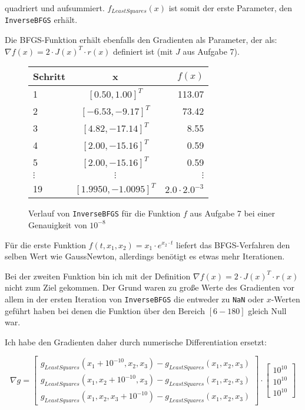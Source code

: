 \documentclass[a4paper, 12pt]{report}
\begin{document}
quadriert und aufsummiert. $f_{LeastSquares}(x)$ ist somit der erste Parameter, den\\
\lstinline[basicstyle=\ttfamily\color{black}]|InverseBFGS| erhält.\par
Die BFGS-Funktion erhält ebenfalls den Gradienten als Parameter, der als: $\nabla f(x) = 2\cdot J(x)^T\cdot r(x)$ definiert ist (mit $J$ aus Aufgabe 7).

\begin{figure}[H]
  \centering
  \def\arraystretch{1.25}
  \begin{tabular}{l|c|r}
    \hline
    \textbf{Schritt} & \textbf{x} & \textbf{$f(x)$}\\
    \hline
    1 & $[0.50, 1.00]^T$ & 113.07\\
    2 & $[-6.53, -9.17]^T$ & 73.42\\
    3 & $[4.82, -17.14]^T$ & 8.55\\
    4 & $[2.00, -15.16]^T$ & 0.59\\
    5 & $[2.00, -15.16]^T$ & 0.59\\
    $\vdots$ & $\vdots$ & $\vdots$\\
    19 & $[1.9950, -1.0095]^T$ & $2.0\cdot 2.0^{-3}$\\
    \hline
  \end{tabular}
  \caption{Verlauf von \lstinline[basicstyle=\ttfamily\color{black}]|InverseBFGS| für die Funktion $f$ aus Aufgabe 7 bei einer Genauigkeit von
          $10^{-8}$}
\end{figure}

Für die erste Funktion $f(t, x_1, x_2) = x_1\cdot e^{x_2\cdot t}$ liefert das BFGS-Verfahren den selben Wert wie GaussNewton, allerdings
benötigt es etwas mehr Iterationen.\par

Bei der zweiten Funktion bin ich mit der Definition $\nabla f(x) = 2\cdot J(x)^T\cdot r(x)$ nicht zum Ziel gekommen. Der Grund waren
zu große Werte des Gradienten vor allem in der ersten Iteration von \lstinline[basicstyle=\ttfamily\color{black}]|InverseBFGS| die
entweder zu \lstinline[basicstyle=\ttfamily\color{black}]|NaN| oder $x$-Werten geführt haben bei denen die Funktion über den Bereich
$[6 - 180]$ gleich Null war.\par
Ich habe den Gradienten daher durch numerische Differentiation ersetzt:

$$\nabla g = \begin{bmatrix}
  g_{LeastSquares}(x_1 + 10^{-10}, x_2, x_3) - g_{LeastSquares}(x_1, x_2, x_3) \\ 
  g_{LeastSquares}(x_1, x_2 + 10^{-10}, x_3) - g_{LeastSquares}(x_1, x_2, x_3) \\
  g_{LeastSquares}(x_1, x_2, x_3 + 10^{-10}) - g_{LeastSquares}(x_1, x_2, x_3)
\end{bmatrix} \cdot \begin{bmatrix} 10^{10} \\ 10^{10} \\ 10^{10} \end{bmatrix}$$
\end{document}
